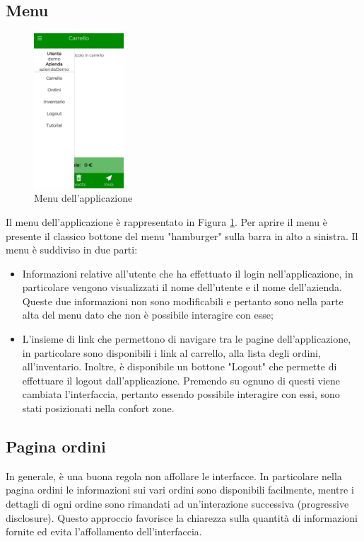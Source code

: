 \documentclass[12pt, a4paper, titlepage]{report}
\begin{document}
	\subsection{Menu}
	\begin{figure}[H] 
		\centering
		\includegraphics[width=0.3\textwidth]{img/menu}
		\caption{Menu dell'applicazione}
		\label{fig:menu}
	\end{figure}
	Il menu dell'applicazione è rappresentato in Figura \ref{fig:menu}. Per aprire il menu è presente il classico bottone del menu "hamburger" sulla barra in alto a sinistra. Il menu è suddiviso in due parti: 
	\begin{itemize}
		\item Informazioni relative all'utente che ha effettuato il login nell'applicazione, in particolare vengono visualizzati il nome dell'utente e il nome dell'azienda. Queste due informazioni non sono modificabili e pertanto sono nella parte alta del menu dato che non è possibile interagire con esse;
		\item L'insieme di link che permettono di navigare tra le pagine dell'applicazione, in particolare sono disponibili i link al carrello, alla lista degli ordini, all'inventario. Inoltre, è disponibile un bottone "Logout" che permette di effettuare il logout dall'applicazione. Premendo su ognuno di questi viene cambiata l'interfaccia, pertanto essendo possibile interagire con essi, sono stati posizionati nella confort zone.
	\end{itemize}

	\subsection{Pagina ordini}
	In generale, è una buona regola non affollare le interfacce. In particolare nella pagina ordini le informazioni sui vari ordini sono disponibili facilmente, mentre i dettagli di ogni ordine sono rimandati ad un'interazione successiva (progressive disclosure). Questo approccio favorisce la chiarezza sulla quantità di informazioni fornite ed evita l'affollamento dell'interfaccia.
	
\end{document}
